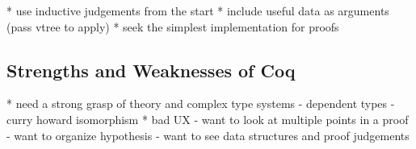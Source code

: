 \documentclass[twocolumn]{article}
\theoremstyle{definition}
\begin{document}
* use inductive judgements from the start
* include useful data as arguments (pass vtree to apply)
* seek the simplest implementation for proofs

\subsection{Strengths and Weaknesses of Coq}

* need a strong grasp of theory and complex type systems
  - dependent types
  - curry howard isomorphism
* bad UX
  - want to look at multiple points in a proof
  - want to organize hypothesis
  - want to see data structures and proof judgements




\end{document}
